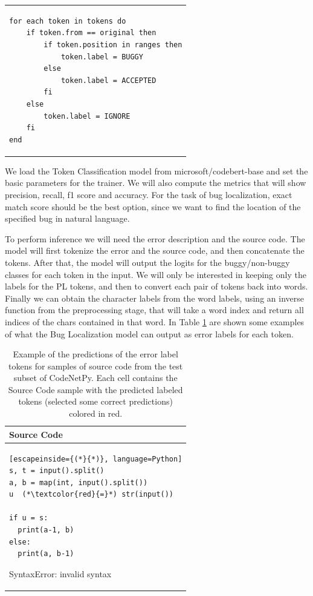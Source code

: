 \documentclass[12pt,a4paper]{report}
\begin{document}
\begin{appendices}
\begin{table}[H]
\begin{tabular}{p{10cm}}
\begin{lstlisting}
for each token in tokens do
    if token.from == original then
        if token.position in ranges then
            token.label = BUGGY
        else
            token.label = ACCEPTED
        fi
    else
        token.label = IGNORE
    fi
end
\end{lstlisting}
\\
\end{tabular}
\end{table}

We load the Token Classification model from microsoft/codebert-base and set the basic parameters for the trainer. We will also compute the metrics that will show precision, recall, f1 score and accuracy. For the task of bug localization, exact match score should be the best option, since we want to find the location of the specified bug in natural language.

To perform inference we will need the error description and the source code. The model will first tokenize the error and the source code, and then concatenate the tokens. After that, the model will output the logits for the buggy/non-buggy classes for each token in the input. We will only be interested in keeping only the labels for the PL tokens, and then to convert each pair of tokens back into words. Finally we can obtain the character labels from the word labels, using an inverse function from the preprocessing stage, that will take a word index and return all indices of the chars contained in that word. In Table \ref{tab:experiments14} are shown some examples of what the Bug Localization model can output as error labels for each token.

\begin{table}[H]\small\linespread{1}
\centering
\caption{Example of the predictions of the error label tokens for samples of source code from the test subset of CodeNetPy. Each cell contains the Source Code sample with the predicted labeled tokens (selected some correct predictions) colored in red.}
\label{tab:experiments14}
\begin{tabular}{p{15cm}}
\textbf{Source Code} \\
\hline
\begin{lstlisting}[escapeinside={(*}{*)}, language=Python]
s, t = input().split()
a, b = map(int, input().split())
u  (*\textcolor{red}{=}*) str(input())

if u = s:
  print(a-1, b)
else:
  print(a, b-1)
\end{lstlisting}

SyntaxError: invalid syntax
\\


\end{tabular}
\end{table}
\end{appendices}
\end{document}

